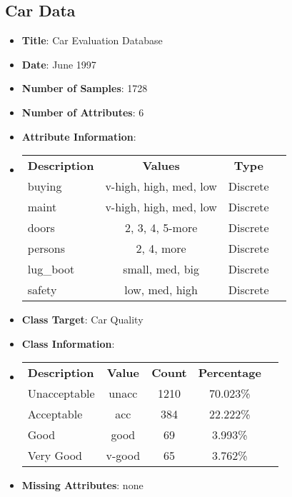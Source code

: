\documentclass[11pt]{article}
\newcommand{\bb}{\textbf}
\begin{document}
\subsection{Car Data}
\begin{itemize}[leftmargin=*]
  \item[] \bb{Title}: Car Evaluation Database
  \item[] \bb{Date}: June 1997
  \item[] \bb{Number of Samples}: 1728
  \item[] \bb{Number of Attributes}: 6
  \item[] \bb{Attribute Information}:
  \item[]
  \begin{tabular}{l c c c }
    \bb{Description} & \bb{Values}            & \bb{Type} \\
    buying           & v-high, high, med, low & Discrete  \\
    maint            & v-high, high, med, low & Discrete  \\
    doors            & 2, 3, 4, 5-more        & Discrete  \\
    persons          & 2, 4, more             & Discrete  \\
    lug\_boot        & small, med, big        & Discrete  \\
    safety           & low, med, high         & Discrete
  \end{tabular}
  \item[] \bb{Class Target}: Car Quality
  \item[] \bb{Class Information}:
  \item[]
  \begin{tabular}{l c c c c }
    \bb{Description} & \bb{Value} & \bb{Count} & \bb{Percentage} \\
    Unacceptable     & unacc      & 1210       & 70.023\%        \\
    Acceptable       & acc        & 384        & 22.222\%        \\
    Good             & good       & 69         & 3.993\%         \\
    Very Good        & v-good     & 65         & 3.762\%
  \end{tabular}
  \item[] \bb{Missing Attributes}: none
\end{itemize}
\end{document}
